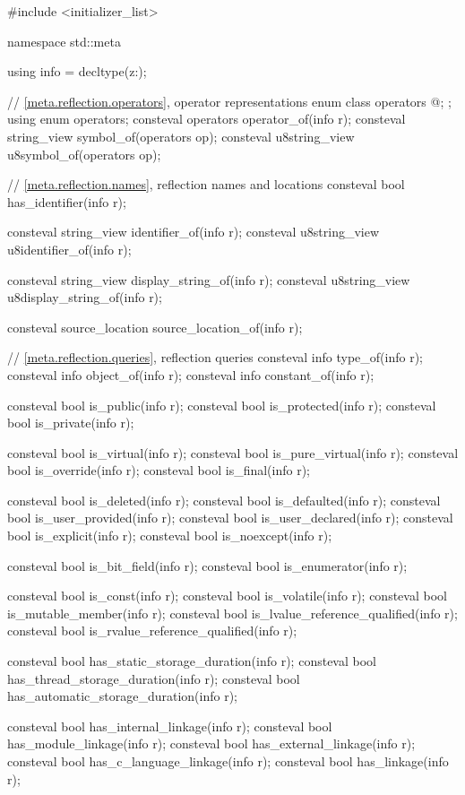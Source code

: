 \begin{codeblock}
#include <initializer_list>

namespace std::meta {
  using info = decltype(^^::);

  // \ref{meta.reflection.operators}, operator representations
  enum class operators {
    @\seebelow@;
  };
  using enum operators;
  consteval operators operator_of(info r);
  consteval string_view symbol_of(operators op);
  consteval u8string_view u8symbol_of(operators op);

  // \ref{meta.reflection.names}, reflection names and locations
  consteval bool has_identifier(info r);

  consteval string_view identifier_of(info r);
  consteval u8string_view u8identifier_of(info r);

  consteval string_view display_string_of(info r);
  consteval u8string_view u8display_string_of(info r);

  consteval source_location source_location_of(info r);

  // \ref{meta.reflection.queries}, reflection queries
  consteval info type_of(info r);
  consteval info object_of(info r);
  consteval info constant_of(info r);

  consteval bool is_public(info r);
  consteval bool is_protected(info r);
  consteval bool is_private(info r);

  consteval bool is_virtual(info r);
  consteval bool is_pure_virtual(info r);
  consteval bool is_override(info r);
  consteval bool is_final(info r);

  consteval bool is_deleted(info r);
  consteval bool is_defaulted(info r);
  consteval bool is_user_provided(info r);
  consteval bool is_user_declared(info r);
  consteval bool is_explicit(info r);
  consteval bool is_noexcept(info r);

  consteval bool is_bit_field(info r);
  consteval bool is_enumerator(info r);

  consteval bool is_const(info r);
  consteval bool is_volatile(info r);
  consteval bool is_mutable_member(info r);
  consteval bool is_lvalue_reference_qualified(info r);
  consteval bool is_rvalue_reference_qualified(info r);

  consteval bool has_static_storage_duration(info r);
  consteval bool has_thread_storage_duration(info r);
  consteval bool has_automatic_storage_duration(info r);

  consteval bool has_internal_linkage(info r);
  consteval bool has_module_linkage(info r);
  consteval bool has_external_linkage(info r);
  consteval bool has_c_language_linkage(info r);
  consteval bool has_linkage(info r);

}
\end{codeblock}
